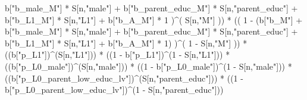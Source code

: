 \documentclass[
]{book}
\newenvironment{Shaded}{\begin{snugshade}}{\end{snugshade}}
\newcommand{\DecValTok}[1]{\textcolor[rgb]{0.00,0.00,0.81}{#1}}
\newcommand{\NormalTok}[1]{#1}
\newcommand{\SpecialCharTok}[1]{\textcolor[rgb]{0.00,0.00,0.00}{#1}}
\newcommand{\StringTok}[1]{\textcolor[rgb]{0.31,0.60,0.02}{#1}}
\begin{document}
\begin{Shaded}
\begin{Highlighting}[]
\NormalTok{           b[}\StringTok{"b\_male\_M"}\NormalTok{] }\SpecialCharTok{*}\NormalTok{ S[n,}\StringTok{"male"}\NormalTok{] }\SpecialCharTok{+} 
\NormalTok{           b[}\StringTok{"b\_parent\_educ\_M"}\NormalTok{] }\SpecialCharTok{*}\NormalTok{ S[n,}\StringTok{"parent\_educ"}\NormalTok{] }\SpecialCharTok{+} 
\NormalTok{           b[}\StringTok{"b\_L1\_M"}\NormalTok{] }\SpecialCharTok{*}\NormalTok{ S[n,}\StringTok{"L1"}\NormalTok{] }\SpecialCharTok{+}
\NormalTok{           b[}\StringTok{"b\_A\_M"}\NormalTok{] }\SpecialCharTok{*} \DecValTok{1}\NormalTok{ )}\SpecialCharTok{\^{}}\NormalTok{( S[n,}\StringTok{"M"}\NormalTok{] )) }\SpecialCharTok{*} 
\NormalTok{      (( }\DecValTok{1} \SpecialCharTok{{-}}\NormalTok{ (b[}\StringTok{"b\_M"}\NormalTok{] }\SpecialCharTok{+} 
\NormalTok{                b[}\StringTok{"b\_male\_M"}\NormalTok{] }\SpecialCharTok{*}\NormalTok{ S[n,}\StringTok{"male"}\NormalTok{] }\SpecialCharTok{+} 
\NormalTok{                b[}\StringTok{"b\_parent\_educ\_M"}\NormalTok{] }\SpecialCharTok{*}\NormalTok{ S[n,}\StringTok{"parent\_educ"}\NormalTok{] }\SpecialCharTok{+} 
\NormalTok{                b[}\StringTok{"b\_L1\_M"}\NormalTok{] }\SpecialCharTok{*}\NormalTok{ S[n,}\StringTok{"L1"}\NormalTok{] }\SpecialCharTok{+}
\NormalTok{                b[}\StringTok{"b\_A\_M"}\NormalTok{] }\SpecialCharTok{*} \DecValTok{1}\NormalTok{) )}\SpecialCharTok{\^{}}\NormalTok{( }\DecValTok{1} \SpecialCharTok{{-}}\NormalTok{ S[n,}\StringTok{"M"}\NormalTok{] ))  }\SpecialCharTok{*}
\NormalTok{      ((b[}\StringTok{"p\_L1"}\NormalTok{])}\SpecialCharTok{\^{}}\NormalTok{(S[n,}\StringTok{"L1"}\NormalTok{])) }\SpecialCharTok{*}
\NormalTok{      ((}\DecValTok{1} \SpecialCharTok{{-}}\NormalTok{ b[}\StringTok{"p\_L1"}\NormalTok{])}\SpecialCharTok{\^{}}\NormalTok{(}\DecValTok{1} \SpecialCharTok{{-}}\NormalTok{ S[n,}\StringTok{"L1"}\NormalTok{])) }\SpecialCharTok{*}
\NormalTok{      ((b[}\StringTok{"p\_L0\_male"}\NormalTok{])}\SpecialCharTok{\^{}}\NormalTok{(S[n,}\StringTok{"male"}\NormalTok{])) }\SpecialCharTok{*} 
\NormalTok{      ((}\DecValTok{1} \SpecialCharTok{{-}}\NormalTok{ b[}\StringTok{"p\_L0\_male"}\NormalTok{])}\SpecialCharTok{\^{}}\NormalTok{(}\DecValTok{1} \SpecialCharTok{{-}}\NormalTok{ S[n,}\StringTok{"male"}\NormalTok{])) }\SpecialCharTok{*} 
\NormalTok{      ((b[}\StringTok{"p\_L0\_parent\_low\_educ\_lv"}\NormalTok{])}\SpecialCharTok{\^{}}\NormalTok{(S[n,}\StringTok{"parent\_educ"}\NormalTok{])) }\SpecialCharTok{*}
\NormalTok{      ((}\DecValTok{1} \SpecialCharTok{{-}}\NormalTok{ b[}\StringTok{"p\_L0\_parent\_low\_educ\_lv"}\NormalTok{])}\SpecialCharTok{\^{}}\NormalTok{(}\DecValTok{1} \SpecialCharTok{{-}}\NormalTok{ S[n,}\StringTok{"parent\_educ"}\NormalTok{])) }
    

\end{Highlighting}
\end{Shaded}
\end{document}
